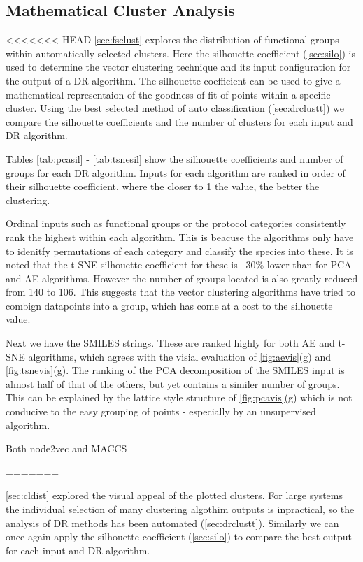 \subsection{Mathematical Cluster Analysis}\label{sec:mathclustanalysis}
<<<<<<< HEAD
\autoref{sec:fsclust} explores the distribution of functional groups within automatically selected clusters. Here the silhouette coefficient (\autoref{sec:silo}) is used to determine the vector clustering technique and its input configuration for the output of a DR algorithm. The silhouette coefficient can be used to give a mathematical representaion of the goodness of fit of points within a specific cluster. Using the best selected method of auto classification (\autoref{sec:drclustt}) we compare the silhouette coefficients and the number of clusters for each input and DR algorithm.

Tables \ref{tab:pcasil} - \ref{tab:tsnesil} show the silhouette coefficients and number of groups for each DR algorithm. Inputs for each algorithm are ranked in order of their silhouette coefficient, where the closer to 1 the value, the better the clustering.

Ordinal inputs such as functional groups or the protocol categories consistently rank the highest within each algorithm. This is beacuse the algorithms only have to idenitfy permutations of each category and classify the species into these. It is noted that the t-SNE silhouette coefficient for these is ~30\% lower than for PCA and AE algorithms. However the number of groups located is also greatly reduced from 140 to 106. This suggests that the vector clustering algorithms have tried to combign datapoints into a group, which has come at a cost to the silhouette value.

Next we have the SMILES strings. These are ranked highly for both AE and t-SNE algorithms, which agrees with the visial evaluation of \autoref{fig:aevis}(g) and \autoref{fig:tsnevis}(g). The ranking of the PCA decomposition of the SMILES input is almost half of that of the others, but yet contains a similer number of groups. This can be explained by the lattice style structure of \autoref{fig:pcavis}(g) which is not conducive to the easy grouping of points - especially by an unsupervised algorithm.

Both node2vec and MACCS

=======

\autoref{sec:cldist} explored the visual appeal of the plotted clusters. For large systems the individual selection of many clustering algothim outputs is inpractical, so the analysis of DR methods has been automated (\autoref{sec:drclustt}). Similarly we can once again apply the silhouette coefficient (\autoref{sec:silo})
to compare the best output for each input and DR algorithm.

